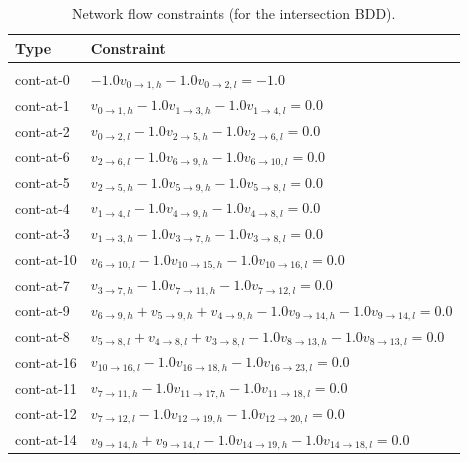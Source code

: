\documentclass[11pt]{article}
\begin{document}
\begin{table}[ht]
\caption{Network flow constraints (for the intersection BDD).}
 \begin{tabular}{l l}
 \textbf{Type} & \textbf{Constraint}\\\hline\\
   cont-at-0 & $-1.0 v_{0 \rightarrow 1, h} -1.0 v_{0 \rightarrow 2, l} = -1.0$\\
   cont-at-1 & $v_{0 \rightarrow 1, h} -1.0 v_{1 \rightarrow 3, h} -1.0 v_{1 \rightarrow 4, l} = 0.0$\\
   cont-at-2 & $v_{0 \rightarrow 2, l} -1.0 v_{2 \rightarrow 5, h} -1.0 v_{2 \rightarrow 6, l} = 0.0$\\
   cont-at-6 & $v_{2 \rightarrow 6, l} -1.0 v_{6 \rightarrow 9, h} -1.0 v_{6 \rightarrow 10, l} = 0.0$\\
   cont-at-5 & $v_{2 \rightarrow 5, h} -1.0 v_{5 \rightarrow 9, h} -1.0 v_{5 \rightarrow 8, l} = 0.0$\\
   cont-at-4 & $v_{1 \rightarrow 4, l} -1.0 v_{4 \rightarrow 9, h} -1.0 v_{4 \rightarrow 8, l} = 0.0$\\
   cont-at-3 & $v_{1 \rightarrow 3, h} -1.0 v_{3 \rightarrow 7, h} -1.0 v_{3 \rightarrow 8, l} = 0.0$\\
   cont-at-10 & $v_{6 \rightarrow 10, l} -1.0 v_{10 \rightarrow 15, h} -1.0 v_{10 \rightarrow 16, l} = 0.0$\\
   cont-at-7 & $v_{3 \rightarrow 7, h} -1.0 v_{7 \rightarrow 11, h} -1.0 v_{7 \rightarrow 12, l} = 0.0$\\
   cont-at-9 & $v_{6 \rightarrow 9, h} + v_{5 \rightarrow 9, h} + v_{4 \rightarrow 9, h} -1.0 v_{9 \rightarrow 14, h} -1.0 v_{9 \rightarrow 14, l} = 0.0$\\
   cont-at-8 & $v_{5 \rightarrow 8, l} + v_{4 \rightarrow 8, l} + v_{3 \rightarrow 8, l} -1.0 v_{8 \rightarrow 13, h} -1.0 v_{8 \rightarrow 13, l} = 0.0$\\
   cont-at-16 & $v_{10 \rightarrow 16, l} -1.0 v_{16 \rightarrow 18, h} -1.0 v_{16 \rightarrow 23, l} = 0.0$\\
   cont-at-11 & $v_{7 \rightarrow 11, h} -1.0 v_{11 \rightarrow 17, h} -1.0 v_{11 \rightarrow 18, l} = 0.0$\\
   cont-at-12 & $v_{7 \rightarrow 12, l} -1.0 v_{12 \rightarrow 19, h} -1.0 v_{12 \rightarrow 20, l} = 0.0$\\
   cont-at-14 & $v_{9 \rightarrow 14, h} + v_{9 \rightarrow 14, l} -1.0 v_{14 \rightarrow 19, h} -1.0 v_{14 \rightarrow 18, l} = 0.0$\\

\end{tabular}
\end{table}
\end{document}
